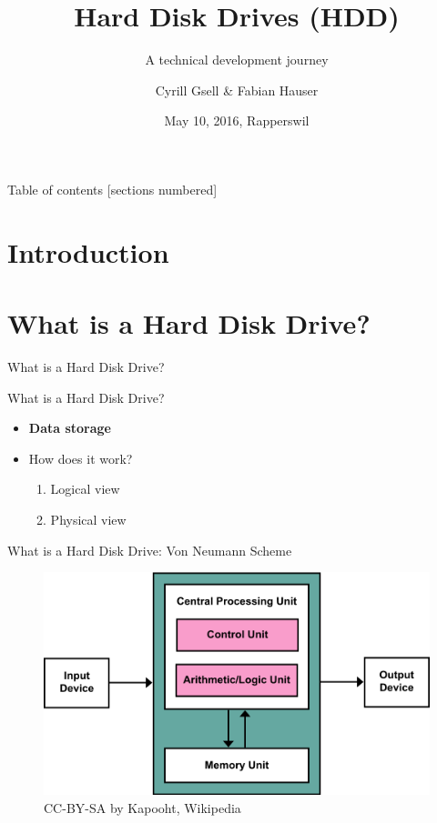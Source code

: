 \documentclass[12pt]{beamer}
\title{Hard Disk Drives (HDD)}
\subtitle{A technical development journey}
\date{May 10, 2016, Rapperswil}
\author{Cyrill Gsell \& Fabian Hauser}
\institute{Computer Science \\
	TecBEC Presentation FS 2016}
\newlength{\wideitemsep}
\let\olditem\item
\renewcommand{\item}{\setlength{\itemsep}{\wideitemsep}\olditem}
\begin{document}
\maketitle

\begin{frame}{Table of contents}
  [sections numbered]
  \tableofcontents
\end{frame}

\section{Introduction}
\section{What is a Hard Disk Drive?}
\begin{frame}[standout]
       What is a Hard Disk Drive?
\end{frame}
\begin{frame}[fragile]{What is a Hard Disk Drive?}
	\begin{itemize}
		\item \textbf{Data storage}
		\item How does it work?
			\begin{enumerate}
				\item Logical view
				\item Physical view
			\end{enumerate}
	\end{itemize}
\end{frame}

\begin{frame}[fragile]{What is a Hard Disk Drive: Von Neumann Scheme}
	\begin{figure}[p]
		\centering
		\includegraphics[width=\linewidth]{img/vonneumann.png}
		\caption{CC-BY-SA by Kapooht, Wikipedia}
	\end{figure}
\end{frame}
\end{document}
